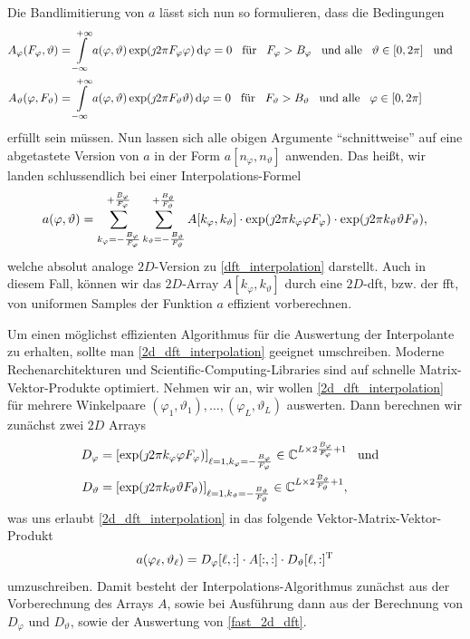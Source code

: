 Die Bandlimitierung von $a$ l\"asst sich nun so formulieren, dass die Bedingungen
\begin{align}
    A_{\varphi}(F_\varphi, \vartheta) 
    &= {\int\limits_{-\infty}^{+\infty}{
        a(\varphi, \vartheta) \exp(\jmath 2 \pi F_\varphi \varphi)
    }\,\mathrm{d}{\varphi}} = 0 
    {\hspace{3mm} \text{f\"ur} \hspace{3mm}} F_\varphi > B_\varphi {\hspace{3mm} \text{und alle} \hspace{3mm}} \vartheta \in [0, 2 \pi] {\hspace{3mm} \text{und} \hspace{3mm}} \\
    A_{\vartheta}(\varphi, F_\vartheta) 
    &= {\int\limits_{-\infty}^{+\infty}{
        a(\varphi, \vartheta) \exp(\jmath 2 \pi F_\vartheta \vartheta)
    }\,\mathrm{d}{\varphi}} = 0 
    {\hspace{3mm} \text{f\"ur} \hspace{3mm}} F_\vartheta > B_\vartheta {\hspace{3mm} \text{und alle} \hspace{3mm}} \varphi \in [0, 2 \pi]
\end{align}
erf\"ullt sein m\"ussen. Nun lassen sich alle obigen Argumente ``schnittweise'' auf eine abgetastete Version von $a$ in der Form $a[n_\varphi, n_\vartheta]$ anwenden. Das hei{\ss}t, wir landen schlussendlich bei einer Interpolations-Formel
\begin{equation}\label{2d_dft_interpolation}
    a(\varphi, \vartheta) = {\sum\limits_{k_\varphi=-\frac{B_\varphi}{F_\varphi}}^{+\frac{B_\varphi}{F_\varphi}}{
        {\sum\limits_{k_\vartheta=-\frac{B_\vartheta}{F_\vartheta}}^{+\frac{B_\vartheta}{F_\vartheta}}{
            A[k_\varphi, k_\vartheta] 
            \cdot \exp(\jmath 2 \pi k_\varphi \varphi F_\varphi)
            \cdot \exp(\jmath 2 \pi k_\vartheta \vartheta F_\vartheta)
        }}
    }},
\end{equation}
welche absolut analoge $2D$-Version zu \eqref{dft_interpolation} darstellt. Auch in diesem Fall, k\"onnen wir das $2D$-Array $A[k_\varphi, k_\vartheta]$ durch eine $2D$-\gls{dft}, bzw. der \gls{fft}, von uniformen Samples der Funktion $a$ effizient vorberechnen.

Um einen m\"oglichst effizienten Algorithmus f\"ur die Auswertung der Interpolante zu erhalten, sollte man \eqref{2d_dft_interpolation} geeignet umschreiben. Moderne Rechenarchitekturen und Scientific-Computing-Libraries sind auf schnelle Matrix-Vektor-Produkte optimiert. Nehmen wir an, wir wollen \eqref{2d_dft_interpolation} f\"ur mehrere Winkelpaare $(\varphi_1, \vartheta_1), \dots, (\varphi_L, \vartheta_L)$ auswerten. Dann berechnen wir zun\"achst zwei $2D$ Arrays
\begin{align}
    D_\varphi &= [\exp(\jmath 2 \pi k_\varphi \varphi F_\varphi)]_{\ell = 1, k_\varphi=-\frac{B_\varphi}{F_\varphi}} \in \mathbb{C}^{L \times 2 \frac{B_\varphi}{F_\varphi} + 1} {\hspace{3mm} \text{und} \hspace{3mm}}\\
    D_\vartheta &= [\exp(\jmath 2 \pi k_\vartheta \vartheta F_\vartheta)]_{\ell = 1, k_\vartheta=-\frac{B_\vartheta}{F_\vartheta}} \in \mathbb{C}^{L \times 2 \frac{B_\vartheta}{F_\vartheta} + 1}, 
\end{align}
was uns erlaubt \eqref{2d_dft_interpolation} in das folgende Vektor-Matrix-Vektor-Produkt
\begin{equation}\label{fast_2d_dft}
    a(\varphi_\ell, \vartheta_\ell) = 
        D_\varphi[\ell, :] \cdot A[:,:] \cdot D_\vartheta[\ell, :]^{\mathrm{T}}
\end{equation}
umzuschreiben. Damit besteht der Interpolations-Algorithmus zun\"achst aus der Vorberechnung des Arrays $A$, sowie bei Ausf\"uhrung dann aus der Berechnung von $D_\varphi$ und $D_\vartheta$, sowie der Auswertung von \eqref{fast_2d_dft}.

